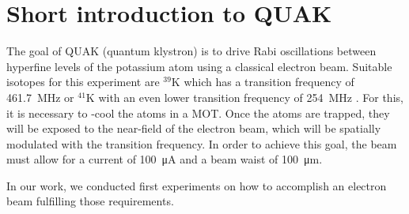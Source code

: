 
\chapter{Short introduction to QUAK}
\label{ch:Short introduction to QuaK}

The goal of QUAK (quantum klystron) is to drive Rabi oscillations between hyperfine levels of the potassium atom using a classical electron beam. Suitable isotopes for this experiment are $^{39}\mathrm{K}$ which has a transition frequency of \SI{461.7}{\mega\hertz} or $^{41}\mathrm{K}$ with an even lower transition frequency of \SI{254}{\mega\hertz} \cite{tiecke:potassium-properties}. For this, it is necessary to -cool the atoms in a MOT. Once the atoms are trapped, they will be exposed to the near-field of the electron beam, which will be spatially modulated with the transition frequency. In order to achieve this goal, the beam must allow for a current of \SI{100}{\micro\ampere} and a beam waist of \SI{100}{\micro\meter}.

In our work, we conducted first experiments on how to accomplish an electron beam fulfilling those requirements.